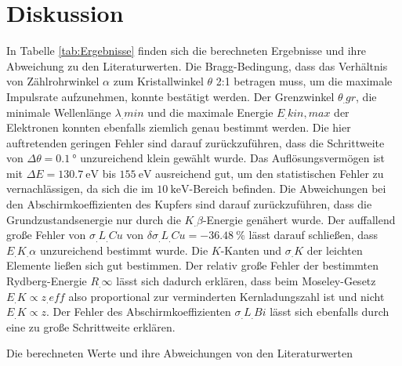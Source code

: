 \section{Diskussion}
\label{sec:Diskussion}

In Tabelle \ref{tab:Ergebnisse} finden sich die berechneten Ergebnisse und ihre Abweichung zu den Literaturwerten.\newline
Die Bragg-Bedingung, dass das Verhältnis von Zählrohrwinkel $\alpha$ zum Kristallwinkel $\theta$ 2:1 betragen muss, um die maximale Impulsrate aufzunehmen, konnte bestätigt werden. 
Der Grenzwinkel $\theta_.{gr}$, die minimale Wellenlänge $\lambda_.{min}$ und die maximale Energie $E_.{kin,max}$ der Elektronen konnten ebenfalls ziemlich genau bestimmt werden. Die hier auftretenden geringen Fehler sind darauf zurückzuführen, dass die Schrittweite von $\Delta\theta=\SI{0,1}{\degree}$ unzureichend klein gewählt wurde.\newline
Das Auflösungsvermögen ist mit $\Delta E=\SI{130,7}{\eV}$ bis $\SI{155}{\eV}$ ausreichend gut, um den statistischen Fehler zu vernachlässigen, da sich die im $\SI{10}{\kilo\eV}$-Bereich befinden.
Die Abweichungen bei den Abschirmkoeffizienten des Kupfers sind darauf zurückzuführen, dass die Grundzustandsenergie nur durch die $K_.{\beta}$-Energie genähert wurde. Der auffallend große Fehler von $\sigma_.{L_.{Cu}}$ von $\delta \sigma_.{L_.{Cu}}=\SI{-36,48}{\percent}$ lässt darauf schließen, dass $E_.{K_.{\alpha}}$ unzureichend bestimmt wurde.\newline
Die $K$-Kanten und $\sigma_.K$ der leichten Elemente ließen sich gut bestimmen.\newline
Der relativ große Fehler der bestimmten Rydberg-Energie $R_.{\infty}$ lässt sich dadurch erklären, dass beim Moseley-Gesetz $E_.K\propto z_.{eff}$ also proportional zur verminderten Kernladungszahl ist und nicht $E_.K\propto z$.
Der Fehler des Abschirmkoeffizienten $\sigma_.{L_.{Bi}}$ lässt sich ebenfalls durch eine zu große Schrittweite erklären.

\begin{table}
\centering
\caption{Die berechneten Werte und ihre Abweichungen von den Literaturwerten}

\label{tab:Ergebnisse}
\end{table}